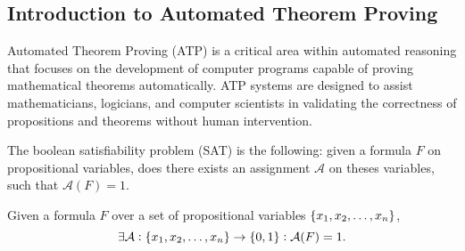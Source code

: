 \subsection{Introduction to Automated Theorem Proving}
Automated Theorem Proving (ATP) is a critical area within automated reasoning that focuses on the development of computer programs capable of proving mathematical theorems automatically. ATP systems are designed to assist mathematicians, logicians, and computer scientists in validating the correctness of propositions and theorems without human intervention.

The boolean satisfiability problem (SAT) is the following: given a formula $F$ on propositional variables, does there exists an assignment $\mathcal{A}$ on theses variables, such that $\mathcal{A}(F)=1$.

Given a formula $F$ over a set of propositional variables $\set{x_1,x_2,\dots,x_n}$, \[
\exists\mathcal{A}:\set{x_1,x_2,\dots,x_n}\to\set{0,1}:\mathcal{A}(F)=1.
\]